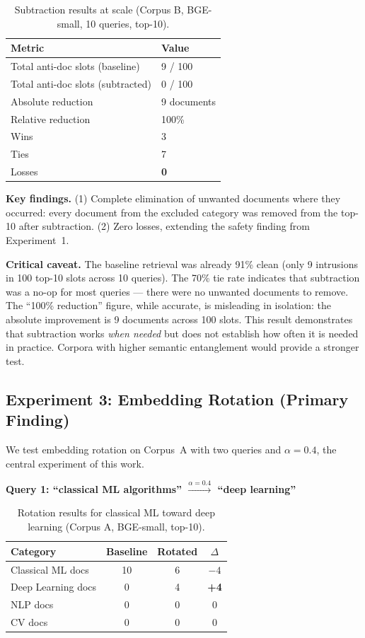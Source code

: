 \documentclass{article}
\begin{document}
\begin{table}[ht]
\centering
\caption{Subtraction results at scale (Corpus B, BGE-small, 10 queries, top-10).}
\label{tab:exp2}
\begin{tabular}{ll}
\toprule
Metric & Value \\
\midrule
Total anti-doc slots (baseline) & 9 / 100 \\
Total anti-doc slots (subtracted) & 0 / 100 \\
Absolute reduction & 9 documents \\
Relative reduction & 100\% \\
Wins & 3 \\
Ties & 7 \\
Losses & \textbf{0} \\
\bottomrule
\end{tabular}
\end{table}

\textbf{Key findings.} (1) Complete elimination of unwanted documents where they occurred: every document from the excluded category was removed from the top-10 after subtraction. (2) Zero losses, extending the safety finding from Experiment~1.

\textbf{Critical caveat.} The baseline retrieval was already 91\% clean (only 9 intrusions in 100 top-10 slots across 10 queries). The 70\% tie rate indicates that subtraction was a no-op for most queries --- there were no unwanted documents to remove. The ``100\% reduction'' figure, while accurate, is misleading in isolation: the absolute improvement is 9 documents across 100 slots. This result demonstrates that subtraction works \emph{when needed} but does not establish how often it is needed in practice. Corpora with higher semantic entanglement would provide a stronger test.

\subsection{Experiment 3: Embedding Rotation (Primary Finding)}

We test embedding rotation on Corpus~A with two queries and $\alpha = 0.4$, the central experiment of this work.

\textbf{Query 1: ``classical ML algorithms'' $\xrightarrow{\alpha=0.4}$ ``deep learning''}

\begin{table}[ht]
\centering
\caption{Rotation results for classical ML toward deep learning (Corpus A, BGE-small, top-10).}
\label{tab:exp3a}
\begin{tabular}{lccc}
\toprule
Category & Baseline & Rotated & $\Delta$ \\
\midrule
Classical ML docs & 10 & 6 & $-4$ \\
Deep Learning docs & 0 & 4 & \textbf{+4} \\
NLP docs & 0 & 0 & 0 \\
CV docs & 0 & 0 & 0 \\
\bottomrule
\end{tabular}
\end{table}
\end{document}
